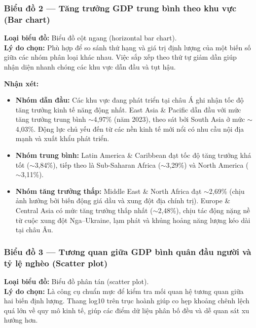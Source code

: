 \subsubsection{Biểu đồ 2 --- Tăng trưởng GDP trung bình theo khu vực (Bar chart)}

\textbf{Loại biểu đồ:} Biểu đồ cột ngang (horizontal bar chart).\\
\textbf{Lý do chọn:} Phù hợp để so sánh thứ hạng và giá trị định lượng của một biến số giữa các nhóm phân loại khác nhau. Việc sắp xếp theo thứ tự giảm dần giúp nhận diện nhanh chóng các khu vực dẫn đầu và tụt hậu.


\textbf{Nhận xét:}
\begin{itemize}
    \item \textbf{Nhóm dẫn đầu:} Các khu vực đang phát triển tại châu Á ghi nhận tốc độ tăng trưởng kinh tế năng động nhất. East Asia \& Pacific dẫn đầu với mức tăng trưởng trung bình $\sim$4,97\% (năm 2023), theo sát bởi South Asia ở mức $\sim$4,03\%. Động lực chủ yếu đến từ các nền kinh tế mới nổi có nhu cầu nội địa mạnh và xuất khẩu phát triển.
    \item \textbf{Nhóm trung bình:} Latin America \& Caribbean đạt tốc độ tăng trưởng khá tốt ($\sim$3,84\%), tiếp theo là Sub-Saharan Africa ($\sim$3,29\%) và North America ($\sim$3,11\%).
    \item \textbf{Nhóm tăng trưởng thấp:} Middle East \& North Africa đạt $\sim$2,69\% (chịu ảnh hưởng bởi biến động giá dầu và xung đột địa chính trị). Europe \& Central Asia có mức tăng trưởng thấp nhất ($\sim$2,48\%), chịu tác động nặng nề từ cuộc xung đột Nga--Ukraine, lạm phát và khủng hoảng năng lượng kéo dài tại châu Âu.
\end{itemize}

\subsubsection{Biểu đồ 3 --- Tương quan giữa GDP bình quân đầu người và tỷ lệ nghèo (Scatter plot)}

\textbf{Loại biểu đồ:} Biểu đồ phân tán (scatter plot).\\
\textbf{Lý do chọn:} Là công cụ chuẩn mực để kiểm tra mối quan hệ tương quan giữa hai biến định lượng. Thang log10 trên trục hoành giúp co hẹp khoảng chênh lệch quá lớn về quy mô kinh tế, giúp các điểm dữ liệu phân bố đều và dễ quan sát xu hướng hơn.

